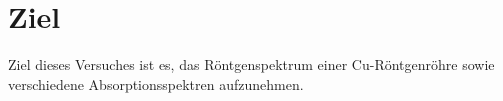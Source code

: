 \section{Ziel}
\label{sec:Ziel}

Ziel dieses Versuches ist es, das Röntgenspektrum einer Cu-Röntgenröhre sowie verschiedene Absorptionsspektren aufzunehmen.